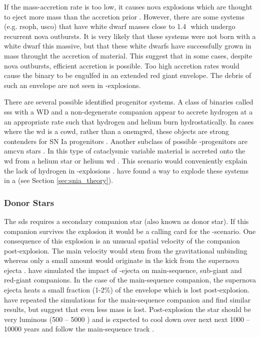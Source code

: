  If the mass-accretion rate is too low, it causes nova explosions which are thought to eject more mass than the accretion prior \citep{Nomoto:1982p451}. However, there are some systems (e.g. \gls{rsoph}, \gls{usco}) that have white dwarf masses close to 1.4\,\msun\ which undergo recurrent nova outbursts. It is very likely that these systems were not born with a white dwarf this massive, but that these white dwarfs have successfully grown in mass throught the accretion of material. This suggest that in some cases, despite nova outbursts, efficient accretion is possible. Too high accretion rates would cause the binary to be engulfed in an extended red giant envelope. The debris of such an envelope are not seen in \snia-explosions. 
 
There are several possible identified progenitor systems. A class of binaries called \gls{sss} with a WD and a non-degenerate companion appear to accrete hydrogen at a an appropriate rate such that hydrogen and helium  burn hydrostatically. In cases where the \gls{wd} is a \gls{cowd}, rather than a \gls{onemgwd}, these objects are strong contenders for SN Ia progenitors \citep[][and references therein]{2006astro.ph..6364D}. Another subclass of possible \sd-progenitors are \gls{amcvn} stars \citep{2005ASPC..330...27N}. In this type of cataclysmic variable material is accreted onto the \gls{wd} from a helium star or helium \gls{wd} \citep{1992A&A...262...97V}. This scenario would conveniently explain the lack of hydrogen in \snia-explosions . \citet[][]{2010A&A...514A..53F} have found a way to explode these systems in a \snia (see Section \ref{sec:snia_theory}).


\subsubsection{Donor Stars}

The \gls{sds} requires a secondary companion star (also known as donor star). If this companion survives the explosion it would be a calling card for the \sd-scenario. One consequence of this explosion is an unusual spatial velocity of the companion post-explosion. The main velocity would stem from the gravitational unbinding whereas only a small amount would originate in the kick from the supernova ejecta \citep{2001ApJ...550L..53C}. \citet{2000ApJS..128..615M} have simulated the impact of \snia-ejecta on main-sequence, sub-giant and red-giant companions. In the case of the main-sequence companion, the supernova ejecta heats a small fraction (1-2\%) of the envelope which is lost post-explosion. \citet{2008A&A...489..943P} have repeated the simulations for the main-sequence companion and find similar results, but suggest that even less mass is lost. Post-explosion the star should be very luminous (500 -- 5000 \lsun) and is expected to cool down over next next 1000 --10000 years and follow the main-sequence track  \citep{2000ApJS..128..615M}. 

